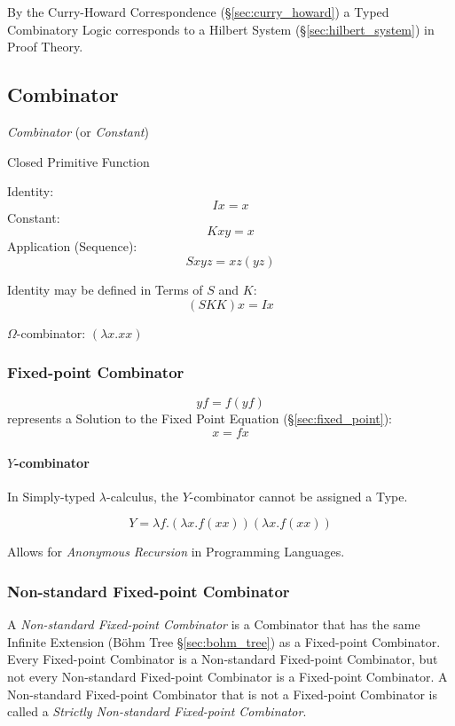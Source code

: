 By the Curry-Howard Correspondence (\S\ref{sec:curry_howard}) a Typed
Combinatory Logic corresponds to a Hilbert System
(\S\ref{sec:hilbert_system}) in Proof Theory.



\subsection{Combinator}\label{sec:combinator}

\emph{Combinator} (or \emph{Constant})

Closed Primitive Function

Identity:
\[
  I x = x
\]
Constant:
\[
  K x y = x
\]
Application (Sequence):
\[
  S x y z = x z (y z)
\]

Identity may be defined in Terms of $S$ and $K$:
\[
  (S K K) x = I x
\]

$\Omega$-combinator: $(\lambda x. x x)$



\subsubsection{Fixed-point Combinator}\label{sec:fixedpoint_combinator}

\[
  y f = f (y f)
\]
represents a Solution to the Fixed Point Equation
(\S\ref{sec:fixed_point}):
\[
  x = f x
\]



\paragraph{$Y$-combinator}\label{sec:y_combinator}\hfill

In Simply-typed $\lambda$-calculus, the $Y$-combinator cannot be
assigned a Type.

\[
  Y = \lambda f.(\lambda x.f (x x)) (\lambda x.f (x x))
\]

Allows for \emph{Anonymous Recursion} in Programming Languages.



\subsubsection{Non-standard Fixed-point Combinator}
\label{sec:nonstandard_combinator}

A \emph{Non-standard Fixed-point Combinator} is a Combinator that has
the same Infinite Extension (B\"ohm Tree \S\ref{sec:bohm_tree}) as a
Fixed-point Combinator. Every Fixed-point Combinator is a Non-standard
Fixed-point Combinator, but not every Non-standard Fixed-point
Combinator is a Fixed-point Combinator. A Non-standard Fixed-point
Combinator that is not a Fixed-point Combinator is called a
\emph{Strictly Non-standard Fixed-point Combinator}.


